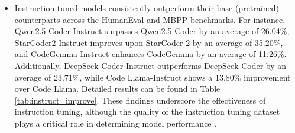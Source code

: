 \begin{itemize}
    \item Instruction-tuned models consistently outperform their base (pretrained) counterparts across the HumanEval and MBPP benchmarks. For instance, Qwen2.5-Coder-Instruct surpasses Qwen2.5-Coder by an average of 26.04\%, StarCoder2-Instruct improves upon StarCoder 2 by an average of 35.20\%, and CodeGemma-Instruct enhances CodeGemma by an average of 11.26\%. Additionally, DeepSeek-Coder-Instruct outperforms DeepSeek-Coder by an average of 23.71\%, while Code Llama-Instruct shows a 13.80\% improvement over Code Llama. Detailed results can be found in Table \ref{tab:instruct_improve}. These findings underscore the effectiveness of instruction tuning, although the quality of the instruction tuning dataset plays a critical role in determining model performance \cite{luo2023wizardcoder,zhou2024lima}.
    

\end{itemize}
